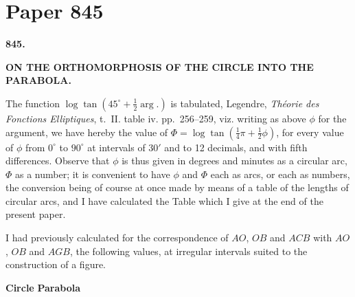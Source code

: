 \documentclass[11pt,a4paper]{book}
\begin{document}
\vspace{1em}
\clearpage


\thispagestyle{empty}


\newpage

\section{Paper 845}

\begin{center}
\large\textbf{845.}

\Large\textbf{ON THE ORTHOMORPHOSIS OF THE CIRCLE INTO THE PARABOLA.}

\end{center}

\bigskip

The function $\log \tan(45^\circ + \frac{1}{2}\arg.)$ is tabulated, Legendre, \textit{Th\'{e}orie des Fonctions Elliptiques}, t.~II. table iv. pp.~256--259, viz. writing as above $\phi$ for the argument, we have hereby the value of $\Phi = \log \tan(\frac{1}{4}\pi + \frac{1}{2}\phi)$, for every value of $\phi$ from $0^\circ$ to $90^\circ$ at intervals of $30'$ and to 12 decimals, and with fifth differences. Observe that $\phi$ is thus given in degrees and minutes as a circular arc, $\Phi$ as a number; it is convenient to have $\phi$ and $\Phi$ each as arcs, or each as numbers, the conversion being of course at once made by means of a table of the lengths of circular arcs, and I have calculated the Table which I give at the end of the present paper.

I had previously calculated for the correspondence of $AO$, $OB$ and $ACB$ with $AO$, $OB$ and $AGB$, the following values, at irregular intervals suited to the construction of a figure.

\bigskip

\textbf{Circle} \hfill \textbf{Parabola}

\medskip
\end{document}
